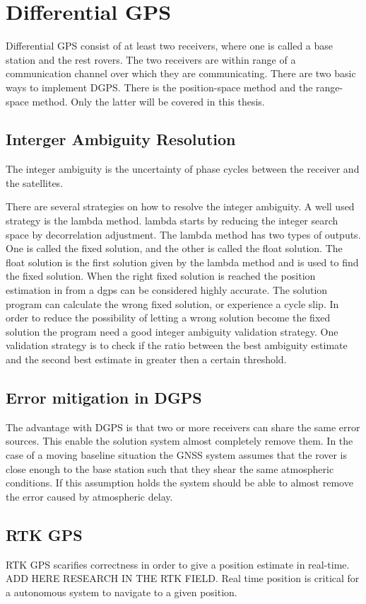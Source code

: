 \section{Differential GPS}
Differential GPS consist of at least two receivers, where one is called a base station and the rest rovers. The two receivers are within range of a communication channel over which they are communicating. There are two basic ways to implement DGPS. There is the position-space method and the range-space method. Only the latter will be covered in this thesis.
\subsection{Interger Ambiguity Resolution}
The integer ambiguity is the uncertainty of phase cycles between the receiver and the satellites.

There are several strategies on how to resolve the integer ambiguity. A well used strategy is the \gls{lambda} method. \gls{lambda} starts by reducing the integer search space by decorrelation adjustment. The \gls{lambda} method has two types of outputs. One is called the fixed solution, and the other is called the float solution. The float solution is the first solution given by the \gls{lambda} method and is used to find the fixed solution. When the right fixed solution is reached the position estimation in from a \gls{dgps} can be considered highly accurate. The solution program can calculate the wrong fixed solution, or experience a cycle slip. In order to reduce the possibility of letting a wrong solution become the fixed solution the program need a good integer ambiguity validation strategy. One validation strategy is to check if the ratio between the best ambiguity estimate and the second best estimate in greater then a certain threshold.
\subsection{Error mitigation in DGPS} \label{ss: Error mitigation DGPS}
The advantage with DGPS is that two or more receivers can share the same error sources. This enable the solution system almost completely remove them.
In the case of a moving baseline situation the GNSS system assumes that the rover is close enough to the base station such that they shear the same atmospheric conditions. If this assumption holds the system should be able to almost remove the error caused by atmospheric delay.


\subsection{RTK GPS}\label{ss:rtk-gps}
RTK GPS scarifies correctness in order to give a position estimate in real-time. ADD HERE RESEARCH IN THE RTK FIELD. Real time position is critical for a autonomous system to navigate to a given position. 


